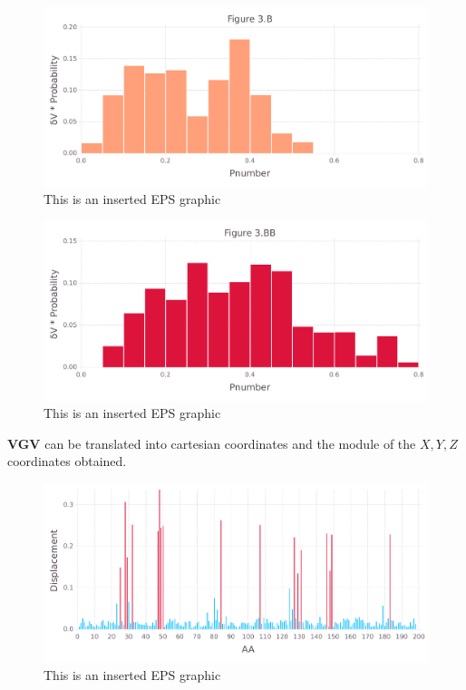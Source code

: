 \documentclass[10pt,letterpaper]{article}
\begin{document}
\begin{figure}[ht]
\begin{center}
\includegraphics[scale=0.5]{1hvr_apo/3bfigure_very_hi-precision.pdf}
\caption{This is an inserted EPS graphic}
\label{fig10}
\end{center}
\end{figure}

\begin{figure}[ht]
\begin{center}
\includegraphics[scale=0.5]{1hvr_apo/3bbfigure_very_hi-precision.pdf}
\caption{This is an inserted EPS graphic}
\label{fig11}
\end{center}
\end{figure}

\FloatBarrier


\textbf{VGV} can be translated into cartesian coordinates and the module of the \(X, Y, Z\) coordinates obtained.

\begin{figure}[ht]
\begin{center}
\includegraphics[scale=0.5]{1hvr_apo/5figure_very_hi-precision.pdf}
\caption{This is an inserted EPS graphic}
\label{fig13}
\end{center}
\end{figure}
\end{document}
